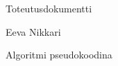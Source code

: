 \documentclass[12pt,a4paper,leqno]{amsart}
\begin{document}
\begin{flushleft}
				Toteutusdokumentti
				\end{flushleft}				\begin{flushright}
				Eeva Nikkari
				\end{flushright}
				
Algoritmi pseudokoodina

 
\end{document}
